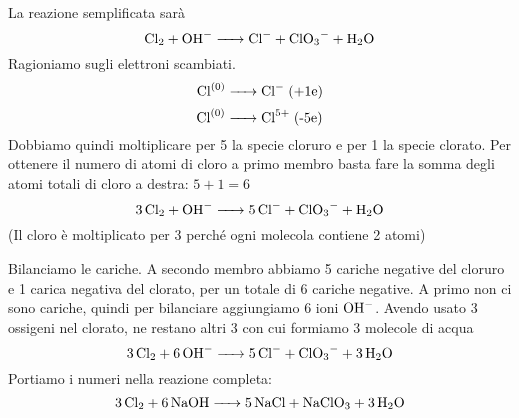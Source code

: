 La reazione semplificata sarà
$$\ce{Cl_2 + OH- -> Cl- + ClO_3- + H_2O}$$
Ragioniamo sugli elettroni scambiati.
$$\ce{Cl^{(0)} ->Cl-} \; \text{(+1e)}$$
$$\ce{Cl^{(0)} ->Cl^5+} \; \text{(-5e)}$$
Dobbiamo quindi moltiplicare per 5 la specie cloruro e per 1 la specie clorato. Per ottenere il numero di atomi di cloro a primo membro basta fare la somma degli atomi totali di cloro a destra: $5+1=6$
$$\ce{3Cl_2 + OH- -> 5Cl- + ClO_3- + H_2O}$$
(Il cloro è moltiplicato per 3 perché ogni molecola contiene 2 atomi)

Bilanciamo le cariche. A secondo membro abbiamo 5 cariche negative del cloruro e 1 carica negativa del clorato, per un totale di 6 cariche negative. A primo non ci sono cariche, quindi per bilanciare aggiungiamo 6 ioni $\rm OH^-$. Avendo usato 3 ossigeni nel clorato, ne restano altri 3 con cui formiamo 3 molecole di acqua
$$\ce{3Cl_2 + 6OH- -> 5Cl- + ClO_3- + 3H_2O}$$
Portiamo i numeri nella reazione completa:
$$\ce{3Cl_2 + 6NaOH -> 5NaCl + NaClO_3 + 3H_2O}$$